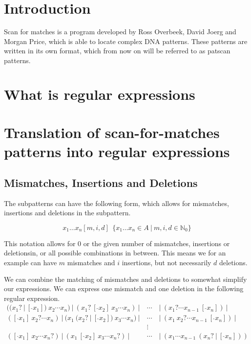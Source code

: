 \documentclass[12pt]{article}
\begin{document}
\newpage

\section{Introduction}

Scan for matches is a program developed by Ross Overbeek, David Joerg and Morgan Price, which is able to locate complex DNA patterns. These patterns are written in its own format, which from now on will be referred to as patscan patterns.

\newpage

\section{What is regular expressions}

\newpage

\section{Translation of scan-for-matches patterns into regular expressions}

\subsection{Mismatches, Insertions and Deletions}

The subpatterns can have the following form, which allows for mismatches, insertions and deletions in the subpattern. 

\begin{equation}
	x_1 \ldots x_n[m, i, d] \ \ \{ x_1 \ldots x_n \in A \ | \ m, i, d \in \mathbb{N}_0 \}
\end{equation} 

This notation allows for 0 or the given number of mismatches, insertions or deletionsin, or all possible combinations in between. This means we for an example can have $m$ mismatches and $i$ insertions, but not necessarily $d$ deletions.

We can combine the matching of mismatches and deletions to somewhat simplify our expressions.
We can express one mismatch and one deletion in the following regular expression.
\begin{eqnarray}
	((x_1?\ |\ [\ \hat{}x_1]) \ x_2 \cdots x_n) \ | \ (x_1? \ [\ \hat{}x_2] \ x_3 \cdots x_n) \ | \ & \cdots & \ | \ (x_1? \cdots x_{n-1} \ [\ \hat{}x_n]) \ | \\
	([\ \hat{}x_1] \ x_2? \cdots x_n) \ | \ (x_1 \ (x_2?\ |\ [\ \hat{}x_2]) \ x_3 \cdots x_n) \ | \ & \cdots & \ | \ (x_1 \ x_2? \cdots x_{n-1} \ [\ \hat{}x_n]) \ | \nonumber \\
	& \vdots & \nonumber \\
	([\ \hat{}x_1] \ x_2 \cdots x_n?) \ | \ (x_1 \ [\ \hat{}x_2] \ x_3 \cdots x_n?) \ | \ & \cdots & \ | \ (x_1 \cdots x_{n-1} \ (x_n?\ |\ [\ \hat{}x_n])) \nonumber
\end{eqnarray}
\end{document}
